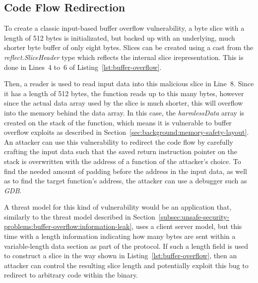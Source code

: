 
\subsection{Code Flow Redirection}\label{subsec:unsafe-security-problems:buffer-overflow:code-flow-redirection}

To create a classic input-based buffer overflow vulnerability, a byte slice with a length of 512 bytes is initializated,
but backed up with an underlying, much shorter byte buffer of only eight bytes.
Slices can be created using a cast from the \textit{reflect.SliceHeader} type which reflects the internal slice
irepresentation.
This is done in Lines~4 to~6 of Listing~\ref{lst:buffer-overflow}.



Then, a reader is used to read input data into this malicious slice in Line~8.
Since it has a length of 512 bytes, the function reads up to this many bytes, however since the actual data array used
by the slice is much shorter, this will overflow into the memory behind the data array.
In this case, the \textit{harmlessData} array is created on the stack of the function, which means it is vulnerable to
buffer overflow exploits as described in Section~\ref{sec:background:memory-safety-layout}.
An attacker can use this vulnerability to redirect the code flow by carefully crafting the input data such that the
saved return instruction pointer on the stack is overwritten with the address of a function of the attacker's choice.
To find the needed amount of padding before the address in the input data, as well as to find the target function's
address, the attacker can use a debugger such as \textit{GDB}.

A threat model for this kind of vulnerability would be an application that, similarly to the threat model described in
Section~\ref{subsec:unsafe-security-problems:buffer-overflow:information-leak}, uses a client server model, but this
time with a length information indicating how many bytes are sent within a variable-length data section as part of the
protocol.
If such a length field is used to construct a slice in the way shown in Listing~\ref{lst:buffer-overflow}, then an
attacker can control the resulting slice length and potentially exploit this bug to redirect to arbitrary code within
the binary.


